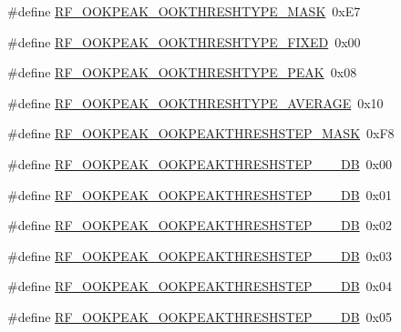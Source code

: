 \begin{DoxyCompactItemize}
\item 
\#define \hyperlink{sx1276Regs-Fsk_8h_ae957050c27e9149fe25fae7276d721ec}{R\+F\+\_\+\+O\+O\+K\+P\+E\+A\+K\+\_\+\+O\+O\+K\+T\+H\+R\+E\+S\+H\+T\+Y\+P\+E\+\_\+\+M\+A\+SK}~0x\+E7
\item 
\#define \hyperlink{sx1276Regs-Fsk_8h_a9d2ecb9366c343ab004e496ac9ceb599}{R\+F\+\_\+\+O\+O\+K\+P\+E\+A\+K\+\_\+\+O\+O\+K\+T\+H\+R\+E\+S\+H\+T\+Y\+P\+E\+\_\+\+F\+I\+X\+ED}~0x00
\item 
\#define \hyperlink{sx1276Regs-Fsk_8h_a20ec7775c45b4a1cc90fe08e498d5bf9}{R\+F\+\_\+\+O\+O\+K\+P\+E\+A\+K\+\_\+\+O\+O\+K\+T\+H\+R\+E\+S\+H\+T\+Y\+P\+E\+\_\+\+P\+E\+AK}~0x08
\item 
\#define \hyperlink{sx1276Regs-Fsk_8h_a5ff6a1e29aba2e560b9ecedad7e31edd}{R\+F\+\_\+\+O\+O\+K\+P\+E\+A\+K\+\_\+\+O\+O\+K\+T\+H\+R\+E\+S\+H\+T\+Y\+P\+E\+\_\+\+A\+V\+E\+R\+A\+GE}~0x10
\item 
\#define \hyperlink{sx1276Regs-Fsk_8h_a524369fe14789f919e9d15908c500e08}{R\+F\+\_\+\+O\+O\+K\+P\+E\+A\+K\+\_\+\+O\+O\+K\+P\+E\+A\+K\+T\+H\+R\+E\+S\+H\+S\+T\+E\+P\+\_\+\+M\+A\+SK}~0x\+F8
\item 
\#define \hyperlink{sx1276Regs-Fsk_8h_aeb7f9969c7c16737c6d44fc3c9e50dfa}{R\+F\+\_\+\+O\+O\+K\+P\+E\+A\+K\+\_\+\+O\+O\+K\+P\+E\+A\+K\+T\+H\+R\+E\+S\+H\+S\+T\+E\+P\+\_\+\_\+\_\+\+DB}~0x00
\item 
\#define \hyperlink{sx1276Regs-Fsk_8h_a502a4cebfd6bf36312360df00b987d5e}{R\+F\+\_\+\+O\+O\+K\+P\+E\+A\+K\+\_\+\+O\+O\+K\+P\+E\+A\+K\+T\+H\+R\+E\+S\+H\+S\+T\+E\+P\+\_\+\_\+\_\+\+DB}~0x01
\item 
\#define \hyperlink{sx1276Regs-Fsk_8h_a3c73c078a2b02c4d7c96a7645cd59dc5}{R\+F\+\_\+\+O\+O\+K\+P\+E\+A\+K\+\_\+\+O\+O\+K\+P\+E\+A\+K\+T\+H\+R\+E\+S\+H\+S\+T\+E\+P\+\_\+\_\+\_\+\+DB}~0x02
\item 
\#define \hyperlink{sx1276Regs-Fsk_8h_ac659aab479d8f4719a2e5e04bed3b9bf}{R\+F\+\_\+\+O\+O\+K\+P\+E\+A\+K\+\_\+\+O\+O\+K\+P\+E\+A\+K\+T\+H\+R\+E\+S\+H\+S\+T\+E\+P\+\_\+\_\+\_\+\+DB}~0x03
\item 
\#define \hyperlink{sx1276Regs-Fsk_8h_a38a4fc95f2ee8beda4d0e385613f1bfb}{R\+F\+\_\+\+O\+O\+K\+P\+E\+A\+K\+\_\+\+O\+O\+K\+P\+E\+A\+K\+T\+H\+R\+E\+S\+H\+S\+T\+E\+P\+\_\+\_\+\_\+\+DB}~0x04
\item 
\#define \hyperlink{sx1276Regs-Fsk_8h_aec641cef999dd2d468a584ea612e2c03}{R\+F\+\_\+\+O\+O\+K\+P\+E\+A\+K\+\_\+\+O\+O\+K\+P\+E\+A\+K\+T\+H\+R\+E\+S\+H\+S\+T\+E\+P\+\_\+\_\+\_\+\+DB}~0x05
\item 

\end{DoxyCompactItemize}
